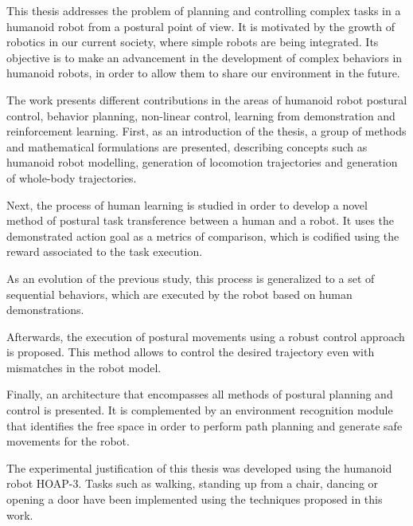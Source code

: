 This thesis addresses the problem of planning and controlling complex tasks in a humanoid robot from a postural point of view. It is motivated by the growth of robotics in our current society, where simple robots are being integrated. Its objective is to make an advancement in the development of complex behaviors in humanoid robots, in order to allow them to share our environment in the future. 

The work presents different contributions in the areas of humanoid robot postural control, behavior planning, non-linear control, learning from demonstration and reinforcement learning. First, as an introduction of the thesis, a group of methods and mathematical formulations are presented, describing concepts such as humanoid robot modelling, generation of locomotion trajectories and generation of whole-body trajectories.
 
Next, the process of human learning is studied in order to develop a novel method of postural task transference between a human and a robot. It uses  the demonstrated action goal as a metrics of comparison, which is codified using the reward associated to the task execution. 

As an evolution of the previous study, this process is generalized to a set of sequential behaviors, which are executed by the robot based on human demonstrations. 

Afterwards, the execution of postural movements using a robust control  approach is proposed. This method allows to control the desired trajectory even with mismatches in the robot model. 

Finally, an architecture that encompasses all  methods of postural planning and control is presented. It is complemented by an environment recognition module that identifies the free space in order to perform path planning and generate safe movements for the robot. 

The experimental justification of this thesis was developed using the humanoid robot HOAP-3. Tasks such as walking, standing up from a chair, dancing or opening a door have been implemented using the techniques proposed in this work. 


